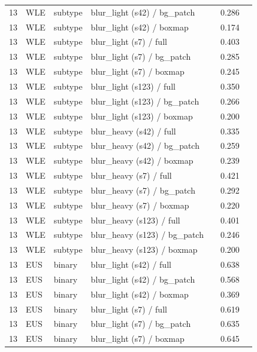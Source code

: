 \begin{longtable}{cL{1.1cm}L{1.5cm}L{5.6cm}ccc}
13 & WLE & subtype & blur\_light (s42) / bg\_patch & \nl{} & 0.286 & \nl{} \\
13 & WLE & subtype & blur\_light (s42) / boxmap & \nl{} & 0.174 & \nl{} \\
13 & WLE & subtype & blur\_light (s7) / full & \nl{} & 0.403 & \nl{} \\
13 & WLE & subtype & blur\_light (s7) / bg\_patch & \nl{} & 0.285 & \nl{} \\
13 & WLE & subtype & blur\_light (s7) / boxmap & \nl{} & 0.245 & \nl{} \\
13 & WLE & subtype & blur\_light (s123) / full & \nl{} & 0.350 & \nl{} \\
13 & WLE & subtype & blur\_light (s123) / bg\_patch & \nl{} & 0.266 & \nl{} \\
13 & WLE & subtype & blur\_light (s123) / boxmap & \nl{} & 0.200 & \nl{} \\
13 & WLE & subtype & blur\_heavy (s42) / full & \nl{} & 0.335 & \nl{} \\
13 & WLE & subtype & blur\_heavy (s42) / bg\_patch & \nl{} & 0.259 & \nl{} \\
13 & WLE & subtype & blur\_heavy (s42) / boxmap & \nl{} & 0.239 & \nl{} \\
13 & WLE & subtype & blur\_heavy (s7) / full & \nl{} & 0.421 & \nl{} \\
13 & WLE & subtype & blur\_heavy (s7) / bg\_patch & \nl{} & 0.292 & \nl{} \\
13 & WLE & subtype & blur\_heavy (s7) / boxmap & \nl{} & 0.220 & \nl{} \\
13 & WLE & subtype & blur\_heavy (s123) / full & \nl{} & 0.401 & \nl{} \\
13 & WLE & subtype & blur\_heavy (s123) / bg\_patch & \nl{} & 0.246 & \nl{} \\
13 & WLE & subtype & blur\_heavy (s123) / boxmap & \nl{} & 0.200 & \nl{} \\
13 & EUS & binary & blur\_light (s42) / full & \nl{} & 0.638 & \nl{} \\
13 & EUS & binary & blur\_light (s42) / bg\_patch & \nl{} & 0.568 & \nl{} \\
13 & EUS & binary & blur\_light (s42) / boxmap & \nl{} & 0.369 & \nl{} \\
13 & EUS & binary & blur\_light (s7) / full & \nl{} & 0.619 & \nl{} \\
13 & EUS & binary & blur\_light (s7) / bg\_patch & \nl{} & 0.635 & \nl{} \\
13 & EUS & binary & blur\_light (s7) / boxmap & \nl{} & 0.645 & \nl{} \\

\end{longtable}
